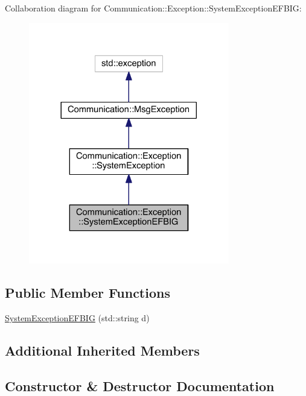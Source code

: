 Collaboration diagram for Communication\+:\+:Exception\+:\+:System\+Exception\+E\+F\+B\+I\+G\+:\nopagebreak
\begin{figure}[H]
\begin{center}
\leavevmode
\includegraphics[width=248pt]{class_communication_1_1_exception_1_1_system_exception_e_f_b_i_g__coll__graph}
\end{center}
\end{figure}
\subsection*{Public Member Functions}
\begin{DoxyCompactItemize}
\item 
\hyperlink{class_communication_1_1_exception_1_1_system_exception_e_f_b_i_g_a1827b1c4c8898443cf7578da61424b88}{System\+Exception\+E\+F\+B\+I\+G} (std\+::string d)
\end{DoxyCompactItemize}
\subsection*{Additional Inherited Members}


\subsection{Constructor \& Destructor Documentation}
\hypertarget{class_communication_1_1_exception_1_1_system_exception_e_f_b_i_g_a1827b1c4c8898443cf7578da61424b88}{}
